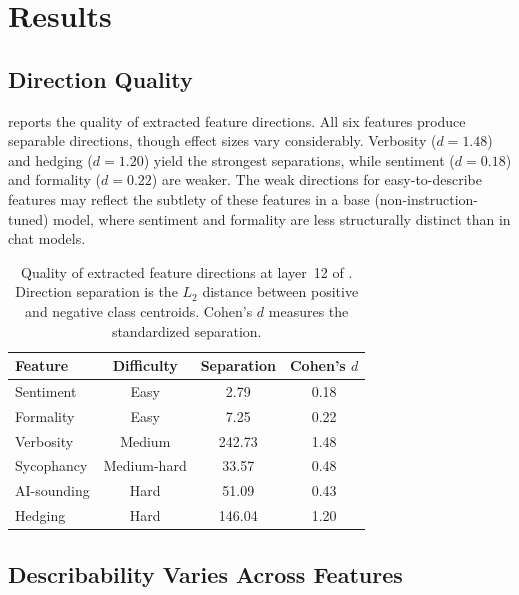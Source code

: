 \section{Results}
\label{sec:results}

\subsection{Direction Quality}
\label{sec:direction_quality}

 reports the quality of extracted feature directions. All six features produce separable directions, though effect sizes vary considerably. Verbosity ($d = 1.48$) and hedging ($d = 1.20$) yield the strongest separations, while sentiment ($d = 0.18$) and formality ($d = 0.22$) are weaker. The weak directions for easy-to-describe features may reflect the subtlety of these features in a base (non-instruction-tuned) model, where sentiment and formality are less structurally distinct than in chat models.

\begin{table}[t]
    \centering
    \caption{Quality of extracted feature directions at layer~12 of \pythia. Direction separation is the $L_2$ distance between positive and negative class centroids. Cohen's $d$ measures the standardized separation.}
    \begin{tabular}{@{}lccc@{}}
        \toprule
        \textbf{Feature} & \textbf{Difficulty} & \textbf{Separation} & \textbf{Cohen's $d$} \\
        \midrule
        Sentiment    & Easy        & 2.79   & 0.18 \\
        Formality    & Easy        & 7.25   & 0.22 \\
        Verbosity    & Medium      & 242.73 & 1.48 \\
        Sycophancy   & Medium-hard & 33.57  & 0.48 \\
        AI-sounding  & Hard        & 51.09  & 0.43 \\
        Hedging      & Hard        & 146.04 & 1.20 \\
        \bottomrule
    \end{tabular}
    \label{tab:directions}
\end{table}

\subsection{Describability Varies Across Features}
\label{sec:describability_results}

